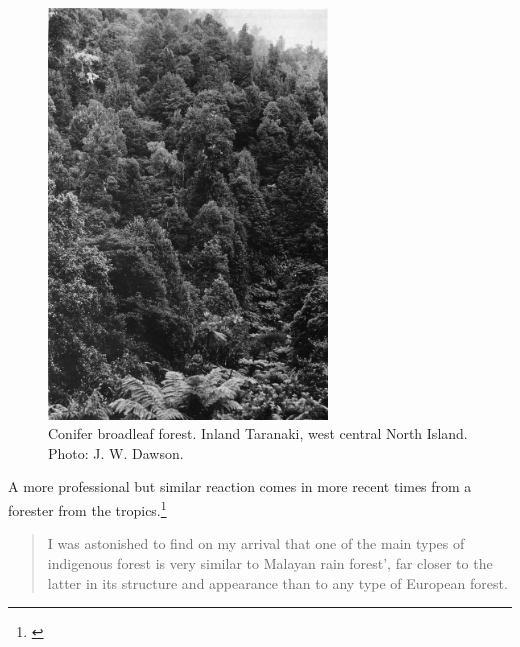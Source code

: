 \begin{figure}
	\includegraphics[width=0.66\textwidth]{graphics/figure6conifer-broadleaf.jpg}
	\centering
	\caption[Conifer broadleaf forest, inland Taranaki]{Conifer broadleaf forest.
	Inland Taranaki, west central North Island.
	Photo: J. W. Dawson.}%
	\label{fig:6conifer-broadleaf}%
\end{figure}

A more professional but similar reaction comes in more recent times from a forester from the tropics.\footnote{\cite{brown1960forester}}

\begin{quote}
	I was astonished to find on my arrival that one of the main types of indigenous forest is very similar to Malayan rain forest', far closer to the latter in its structure and appearance than to any type of European forest.
\end{quote}

